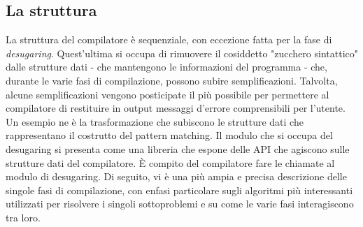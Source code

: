 \documentclass[10pt,a4paper]{article}
\begin{document}
\subsection{La struttura}

La struttura del compilatore è sequenziale, con eccezione fatta per la fase di \textit{desugaring}. Quest'ultima si
occupa di rimuovere il cosiddetto "zucchero sintattico" dalle strutture dati - che mantengono le informazioni del
programma - che, durante le varie fasi di compilazione, possono subire semplificazioni. Talvolta, alcune semplificazioni
vengono posticipate il più possibile per permettere al compilatore di restituire in output messaggi d'errore comprensibili
per l'utente. Un esempio ne è la trasformazione che subiscono le strutture dati che rappresentano il costrutto del
pattern matching. Il modulo che si occupa del desugaring si presenta come una libreria che espone delle API che agiscono
sulle strutture dati del compilatore. \`E compito del compilatore fare le chiamate al modulo di desugaring. Di seguito,
vi è una più ampia e precisa descrizione delle singole fasi di compilazione, con enfasi particolare sugli algoritmi
più interessanti utilizzati per risolvere i singoli sottoproblemi e su come le varie fasi interagiscono tra loro.
\end{document}
